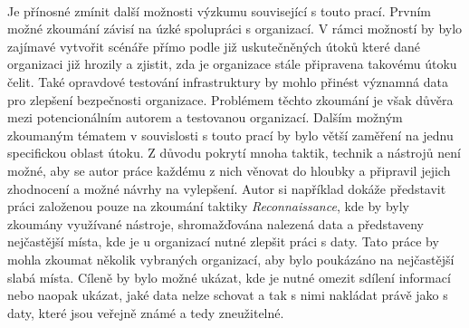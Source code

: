 \paragraph{}
Je přínosné zmínit další možnosti výzkumu související s touto prací.
Prvním možné zkoumání závisí na úzké spolupráci s organizací.
V rámci možností by bylo zajímavé vytvořit scénáře přímo podle již uskutečněných útoků které dané organizaci již hrozily a zjistit, zda je organizace stále připravena takovému útoku čelit.
Také opravdové testování infrastruktury by mohlo přinést významná data pro zlepšení bezpečnosti organizace.
Problémem těchto zkoumání je však důvěra mezi potencionálním autorem a testovanou organizací.
Dalším možným zkoumaným tématem v souvislosti s touto prací by bylo větší zaměření na jednu specifickou oblast útoku.
Z důvodu pokrytí mnoha taktik, technik a nástrojů není možné, aby se autor práce každému z nich věnovat do hloubky a připravil jejich zhodnocení a možné návrhy na vylepšení.
Autor si například dokáže představit práci založenou pouze na zkoumání taktiky \textit{Reconnaissance}, kde by byly zkoumány využívané nástroje, shromažďována nalezená data a představeny nejčastější místa, kde je u organizací nutné zlepšit práci s daty.
Tato práce by mohla zkoumat několik vybraných organizací, aby bylo poukázáno na nejčastější slabá místa.
Cíleně by bylo možné ukázat, kde je nutné omezit sdílení informací nebo naopak ukázat, jaké data nelze schovat a tak s nimi nakládat právě jako s daty, které jsou veřejně známé a tedy zneužitelné.












